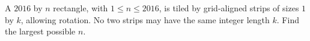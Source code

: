A $2016$ by $n$ rectangle, with $1\le n\le2016$, is tiled by grid-aligned strips of sizes $1$ by $k$, allowing rotation. No two strips may have the same integer length $k$. Find the largest possible $n$.
